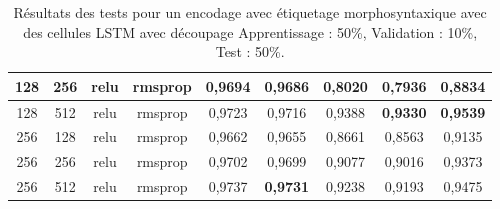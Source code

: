 \begin{table}[H]
{\begin{tabular}{|c|c|c|c|c|c|c|c|c|}
				128 & 256 & relu & rmsprop & 0,9694 & 0,9686 & 0,8020 & 0,7936 & 0,8834 \\ \hline
				\rowcolor[HTML]{96FFFB} 
				128 & 512 & relu & rmsprop & 0,9723 & 0,9716 & 0,9388 & \textbf{0,9330} & \textbf{0,9539} \\ \hline
				256 & 128 & relu & rmsprop & 0,9662 & 0,9655 & 0,8661 & 0,8563 & 0,9135 \\ \hline
				256 & 256 & relu & rmsprop & 0,9702 & 0,9699 & 0,9077 & 0,9016 & 0,9373 \\ \hline
				256 & 512 & relu & rmsprop & 0,9737 & \textbf{0,9731} & 0,9238 & 0,9193 & 0,9475 \\ \hline
			\end{tabular}%
		}
		\caption{Résultats des tests pour un encodage avec étiquetage morphosyntaxique avec des cellules LSTM avec découpage Apprentissage : 50\%, Validation : 10\%, Test : 50\%.}
		\label{tab:lstm_2_postag}
	\end{table}

